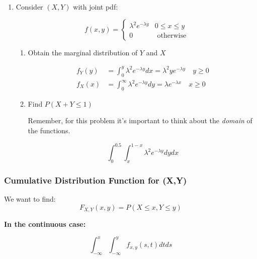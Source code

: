\documentclass{article}
\begin{document}
\begin{enumerate}
    \item Consider $(X,Y)$ with joint pdf:

    \begin{equation*}
        f(x,y) = \begin{cases}
            \lambda^2 e^{-\lambda y} & 0 \leq x \leq y\\
            0 & \text{ otherwise}
        \end{cases}
    \end{equation*}

    \begin{enumerate}
        \item Obtain the marginal distribution of $Y$ and $X$

        \begin{equation*}
            \begin{split}
                f_Y(y) &= \int_0^y \lambda^2 e^{-\lambda y}dx = \lambda^2 y e^{-\lambda y} \quad y \geq 0\\
                f_X(x) &=\int_0^\infty \lambda^2 e^{-\lambda y}dy = \lambda e^{-\lambda x} \quad x \geq 0
            \end{split}
        \end{equation*}

        \item Find $P(X+Y \leq 1)$

        Remember, for this problem it's important to think about the \textit{domain} of the functions.

        \begin{equation*}
            \int_0^{0.5} \int_x^{1-x} \lambda^2 e^{-\lambda y} dy dx
        \end{equation*}
    \end{enumerate}
\end{enumerate}

\subsubsection{Cumulative Distribution Function for (X,Y)}

We want to find:
\begin{equation*}
    F_{X,Y}(x,y) = P(X\leq x, Y \leq y)
\end{equation*}

\noindent \textbf{In the continuous case:}

\begin{equation*}
    \int_{-\infty}^x \int_{-\infty}^y f_{x,y}(s,t)dt ds
\end{equation*}
\end{document}
